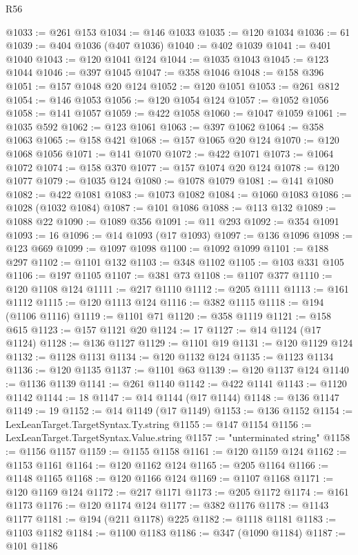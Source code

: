 \begin{lexlean}{R56}
\begin{coremodule}
@1033 := @261 @153
@1034 := @146 @1033
@1035 := @120 @1034
@1036 := 61
@1039 := @404 @1036 (@407 @1036)
@1040 := @402 @1039
@1041 := @401 @1040
@1043 := @120 @1041 @124
@1044 := @1035 @1043
@1045 := @123 @1044
@1046 := @397 @1045
@1047 := @358 @1046
@1048 := @158 @396
@1051 := @157 @1048 @20 @124
@1052 := @120 @1051
@1053 := @261 @812
@1054 := @146 @1053
@1056 := @120 @1054 @124
@1057 := @1052 @1056
@1058 := @141 @1057
@1059 := @422 @1058
@1060 := @1047 @1059
@1061 := @1035 @592
@1062 := @123 @1061
@1063 := @397 @1062
@1064 := @358 @1063
@1065 := @158 @421
@1068 := @157 @1065 @20 @124
@1070 := @120 @1068 @1056
@1071 := @141 @1070
@1072 := @422 @1071
@1073 := @1064 @1072
@1074 := @158 @370
@1077 := @157 @1074 @20 @124
@1078 := @120 @1077
@1079 := @1035 @124
@1080 := @1078 @1079
@1081 := @141 @1080
@1082 := @422 @1081
@1083 := @1073 @1082
@1084 := @1060 @1083
@1086 := @1028 (@1032 @1084)
@1087 := @101 @1086
@1088 := @113 @132
@1089 := @1088 @22
@1090 := @1089 @356
@1091 := @11 @293
@1092 := @354 @1091
@1093 := 16
@1096 := @14 @1093 (@17 @1093)
@1097 := @136 @1096
@1098 := @123 @669
@1099 := @1097 @1098
@1100 := @1092 @1099
@1101 := @188 @297
@1102 := @1101 @132
@1103 := @348 @1102
@1105 := @103 @331 @105
@1106 := @197 @1105
@1107 := @381 @73
@1108 := @1107 @377
@1110 := @120 @1108 @124
@1111 := @217 @1110
@1112 := @205 @1111
@1113 := @161 @1112
@1115 := @120 @1113 @124
@1116 := @382 @1115
@1118 := @194 (@1106 @1116)
@1119 := @1101 @71
@1120 := @358 @1119
@1121 := @158 @615
@1123 := @157 @1121 @20
@1124 := 17
@1127 := @14 @1124 (@17 @1124)
@1128 := @136 @1127
@1129 := @1101 @19
@1131 := @120 @1129 @124
@1132 := @1128 @1131
@1134 := @120 @1132 @124
@1135 := @1123 @1134
@1136 := @120 @1135
@1137 := @1101 @63
@1139 := @120 @1137 @124
@1140 := @1136 @1139
@1141 := @261 @1140
@1142 := @422 @1141
@1143 := @1120 @1142
@1144 := 18
@1147 := @14 @1144 (@17 @1144)
@1148 := @136 @1147
@1149 := 19
@1152 := @14 @1149 (@17 @1149)
@1153 := @136 @1152
@1154 := LexLeanTarget.TargetSyntax.Ty.string
@1155 := @147 @1154
@1156 := LexLeanTarget.TargetSyntax.Value.string
@1157 := "unterminated string"
@1158 := @1156 @1157
@1159 := @1155 @1158
@1161 := @120 @1159 @124
@1162 := @1153 @1161
@1164 := @120 @1162 @124
@1165 := @205 @1164
@1166 := @1148 @1165
@1168 := @120 @1166 @124
@1169 := @1107 @1168
@1171 := @120 @1169 @124
@1172 := @217 @1171
@1173 := @205 @1172
@1174 := @161 @1173
@1176 := @120 @1174 @124
@1177 := @382 @1176
@1178 := @1143 @1177
@1181 := @194 (@211 @1178) @225
@1182 := @1118 @1181
@1183 := @1103 @1182
@1184 := @1100 @1183
@1186 := @347 (@1090 @1184)
@1187 := @101 @1186

\end{coremodule}
\end{lexlean}

